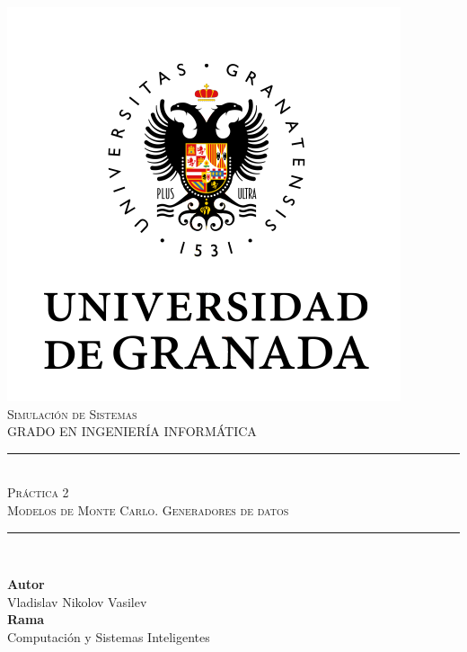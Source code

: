 \documentclass[11pt,a4paper]{report}
\newcommand{\asignatura}{Simulación de Sistemas}
\newcommand{\autor}{Vladislav Nikolov Vasilev}
\newcommand{\titulo}{Práctica 2}
\newcommand{\subtitulo}{Modelos de Monte Carlo. Generadores de datos}
\begin{document}

\begin{titlepage}

\begin{minipage}{\textwidth}

\centering

\includegraphics[scale=0.5]{img/ugr.png}\\

\textsc{\Large \asignatura{}\\[0.2cm]}
\textsc{GRADO EN INGENIERÍA INFORMÁTICA}\\[1cm]

\noindent\rule[-1ex]{\textwidth}{1pt}\\[1.5ex]
\textsc{{\Huge \titulo\\[0.5ex]}}
\textsc{{\Large \subtitulo\\}}
\noindent\rule[-1ex]{\textwidth}{2pt}\\[3.5ex]

\end{minipage}

\vspace{0.5cm}

\begin{minipage}{\textwidth}

\centering

\textbf{Autor}\\ {\autor{}}\\[2.5ex]
\textbf{Rama}\\ {Computación y Sistemas Inteligentes}\\[2.5ex]
\vspace{0.3cm}


\end{minipage}
\end{titlepage}
\end{document}
